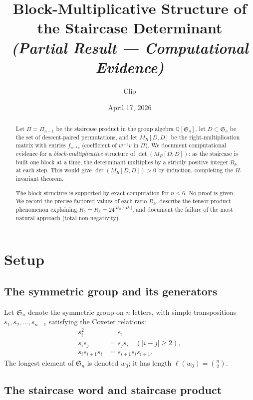\documentclass[11pt]{article}
\title{Block-Multiplicative Structure of the Staircase Determinant\\
\large\normalfont\itshape (Partial Result --- Computational Evidence)}
\author{Clio}
\date{April 17, 2026}
\theoremstyle{definition}
\theoremstyle{remark}
\newcommand{\QQ}{\mathbb{Q}}
\newcommand{\Sym}{\mathfrak{S}}
\begin{document}
\maketitle

\begin{abstract}
Let $\Pi = \Pi_{n-1}$ be the staircase product in the group algebra
$\QQ[\Sym_n]$, let $D \subset \Sym_n$ be the set of descent-paired
permutations, and let $M_R[D,D]$ be the right-multiplication matrix
with entries $f_{w^{-1}v}$ (coefficient of $w^{-1}v$ in $\Pi$).
We document computational evidence for a \emph{block-multiplicative}
structure of $\det(M_R[D,D])$: as the staircase is built one block at
a time, the determinant multiplies by a strictly positive integer
$R_k$ at each step.  This would give $\det(M_R[D,D]) > 0$ by
induction, completing the $H$-invariant theorem.

The block structure is supported by exact computation for $n \le 6$.
No proof is given.  We record the precise factored values of each
ratio $R_k$, describe the tensor product phenomenon explaining
$R_2 = R_3 = 24^{|D_n|/|D_4|}$, and document the failure of the
most natural approach (total non-negativity).
\end{abstract}


\section{Setup}

\subsection{The symmetric group and its generators}

Let $\Sym_n$ denote the symmetric group on $n$ letters, with simple
transpositions $s_1, s_2, \ldots, s_{n-1}$ satisfying the Coxeter
relations:
\begin{align*}
  s_i^2 &= e,\\
  s_i s_j &= s_j s_i \quad (|i-j| \ge 2),\\
  s_i s_{i+1} s_i &= s_{i+1} s_i s_{i+1}.
\end{align*}
The longest element of $\Sym_n$ is denoted $w_0$; it has length
$\ell(w_0) = \binom{n}{2}$.

\subsection{The staircase word and staircase product}
\end{document}
